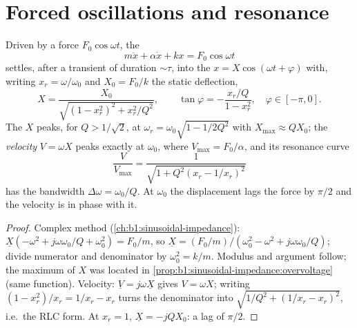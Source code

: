 \section{Forced oscillations and resonance}

\begin{theorem}\label{thm:b1:oscillators-resonance:forced}
Driven by a force $F_0\cos\omega t$, the 
\[
m\ddot x + \alpha\dot x + kx = F_0\cos\omega t
\]
settles, after a transient of duration $\sim\tau$, into the  $x = X\cos(\omega t + \varphi)$ with, writing $x_r = \omega/\omega_0$
and $X_0 = F_0/k$ the static deflection,
\[
X = \frac{X_0}{\sqrt{(1 - x_r^2)^2 + x_r^2/Q^2}}, \qquad
\tan\varphi = -\frac{x_r/Q}{1 - x_r^2}, \quad \varphi \in [-\pi, 0] .
\]
The \emph{} $X$ peaks, for $Q > 1/\sqrt2$, at $\omega_r =
\omega_0\sqrt{1 - 1/2Q^2}$ with $X_{\max} \approx QX_0$; the \emph{velocity
} $V = \omega X$ peaks exactly at $\omega_0$, where $V_{\max} =
F_0/\alpha$, and its resonance curve
\[
\frac{V}{V_{\max}} = \frac{1}{\sqrt{1 + Q^2(x_r - 1/x_r)^2}}
\]
has the bandwidth $\Delta\omega = \omega_0/Q$. At $\omega_0$ the displacement
lags the force by $\pi/2$ and the velocity is in phase with it.
\end{theorem}

\begin{proof}
Complex method (\cref{ch:b1:sinusoidal-impedance}): $\underline X(-\omega^2
+ j\omega\omega_0/Q + \omega_0^2) = F_0/m$, so $\underline X = (F_0/m)/(\omega_0^2
- \omega^2 + j\omega\omega_0/Q)$; divide numerator and denominator by
$\omega_0^2 = k/m$. Modulus and argument follow; the maximum of $X$ was
located in \cref{prop:b1:sinusoidal-impedance:overvoltage} (same
function). Velocity: $\underline V = j\omega\underline X$ gives $V = \omega X$;
writing $(1 - x_r^2)/x_r = 1/x_r - x_r$ turns the denominator into
$\sqrt{1/Q^2 + (1/x_r - x_r)^2}$, i.e.\ the RLC form. At $x_r = 1$,
$\underline X = -jQX_0$: a lag of $\pi/2$.
\end{proof}

